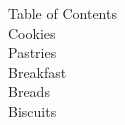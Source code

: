 \documentclass[11pt]{article}
\begin{document}
Table of Contents\\
Cookies\\
Pastries\\
Breakfast\\
Breads\\
Biscuits
\end{document}
